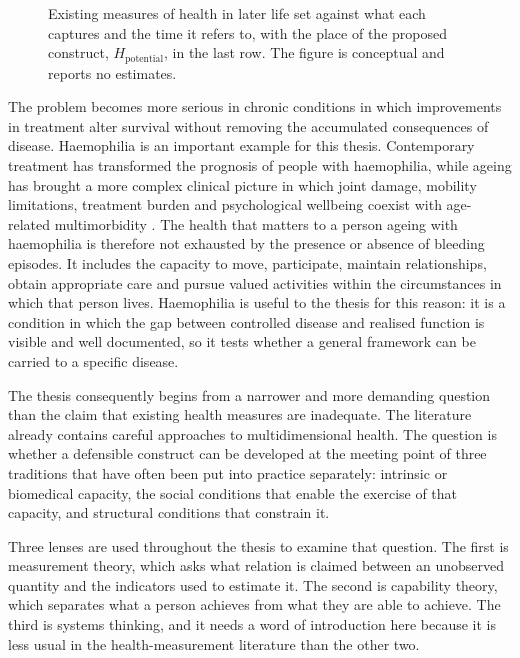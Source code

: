 \begin{figure}[htbp]
\centering

\caption{Existing measures of health in later life set against what each captures and the time it refers to, with the place of the proposed construct, $H_{\text{potential}}$, in the last row. The figure is conceptual and reports no estimates.}
\label{fig:intro-measures}
\end{figure}

The problem becomes more serious in chronic conditions in which improvements in treatment alter survival without removing the accumulated consequences of disease. Haemophilia is an important example for this thesis. Contemporary treatment has transformed the prognosis of people with haemophilia, while ageing has brought a more complex clinical picture in which joint damage, mobility limitations, treatment burden and psychological wellbeing coexist with age-related multimorbidity \citep{srivastava_2020,mauser_2009}. The health that matters to a person ageing with haemophilia is therefore not exhausted by the presence or absence of bleeding episodes. It includes the capacity to move, participate, maintain relationships, obtain appropriate care and pursue valued activities within the circumstances in which that person lives. Haemophilia is useful to the thesis for this reason: it is a condition in which the gap between controlled disease and realised function is visible and well documented, so it tests whether a general framework can be carried to a specific disease.

The thesis consequently begins from a narrower and more demanding question than the claim that existing health measures are inadequate. The literature already contains careful approaches to multidimensional health. The question is whether a defensible construct can be developed at the meeting point of three traditions that have often been put into practice separately: intrinsic or biomedical capacity, the social conditions that enable the exercise of that capacity, and structural conditions that constrain it.

Three lenses are used throughout the thesis to examine that question. The first is measurement theory, which asks what relation is claimed between an unobserved quantity and the indicators used to estimate it. The second is capability theory, which separates what a person achieves from what they are able to achieve. The third is systems thinking, and it needs a word of introduction here because it is less usual in the health-measurement literature than the other two.

